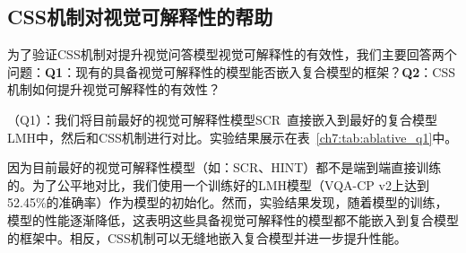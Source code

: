 \begin{table}[tbp]
    \begin{center}
    \end{center}
    \caption{不同视觉问答模型在数据集VQA-CP v1上的性能对比}
    \label{ch7:tab:SOTA_v1}
\end{table}


\subsection{CSS机制对视觉可解释性的帮助}

为了验证CSS机制对提升视觉问答模型视觉可解释性的有效性，我们主要回答两个问题：\textbf{Q1}：现有的具备视觉可解释性的模型能否嵌入复合模型的框架？\textbf{Q2}：CSS机制如何提升视觉可解释性的有效性？

\textbf{}（Q1）：我们将目前最好的视觉可解释性模型SCR~\cite{wu2019self}直接嵌入到最好的复合模型LMH中，然后和CSS机制进行对比。实验结果展示在表~\ref{ch7:tab:ablative_q1}中。

因为目前最好的视觉可解释性模型（如：SCR、HINT）都不是端到端直接训练的。为了公平地对比，我们使用一个训练好的LMH模型（VQA-CP v2上达到52.45\%的准确率）作为模型的初始化。然而，实验结果发现，随着模型的训练，模型的性能逐渐降低，这表明这些具备视觉可解释性的模型都不能嵌入到复合模型的框架中。相反，CSS机制可以无缝地嵌入复合模型并进一步提升性能。

